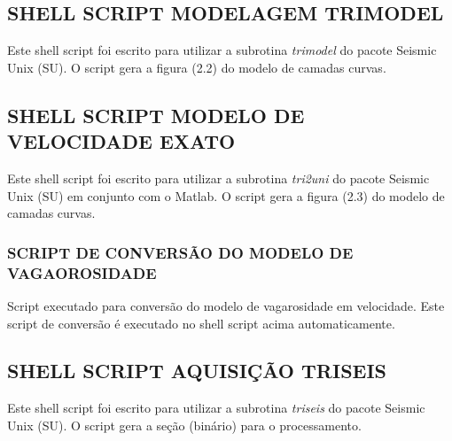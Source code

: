 \appendix
\renewcommand{\thesubsection}{\Alph{subsection}}
\label{apendices}

\subsection{SHELL SCRIPT MODELAGEM TRIMODEL}
\label{apendice_A}

Este shell script foi escrito para utilizar a subrotina \textit{trimodel} do pacote Seismic Unix (SU). 
O script gera a figura (2.2) do modelo de camadas curvas.



\newpage
\subsection{SHELL SCRIPT MODELO DE VELOCIDADE EXATO}
\label{apendice_B}

Este shell script foi escrito para utilizar a subrotina \textit{tri2uni} do pacote Seismic Unix (SU) em conjunto com o Matlab. 
O script gera a figura (2.3) do modelo de camadas curvas.



\subsubsection*{SCRIPT DE CONVERSÃO DO MODELO DE VAGAOROSIDADE}
Script executado para conversão do modelo de vagarosidade em velocidade. Este script de conversão é executado no shell script acima automaticamente.


\newpage
\subsection{SHELL SCRIPT AQUISIÇÃO TRISEIS}
\label{apendice_C}

Este shell script foi escrito para utilizar a subrotina \textit{triseis} do pacote Seismic Unix (SU). 
O script gera a seção (binário) para o processamento.


\newpage
